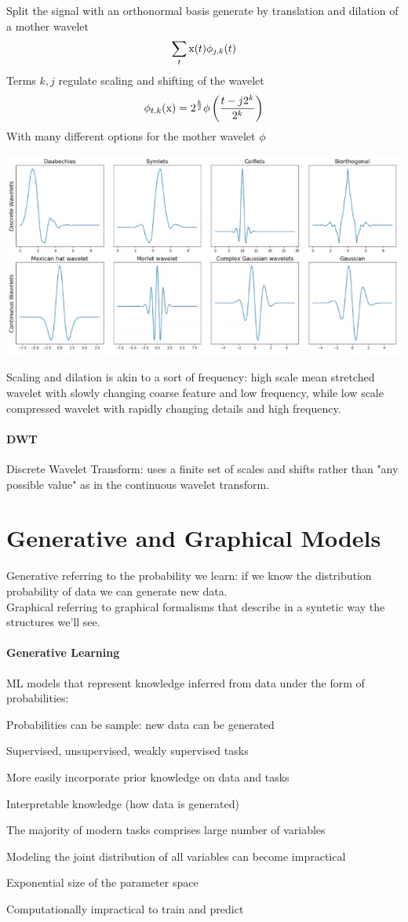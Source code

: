 \documentclass[10pt]{report}
\begin{document}
Split the signal with an orthonormal basis generate by translation and dilation of a mother wavelet $$\sum_t \hbox{x}(t)\phi_{j,k}(t)$$
Terms $k,j$ regulate scaling and shifting of the wavelet
$$\phi_{t,k}(\hbox{x}) = 2^{\frac{k}{2}}\phi\left(\frac{t-j2^k}{2^k}\right)$$
With many different options for the mother wavelet $\phi$
\begin{center}
	\includegraphics[scale=0.5]{13.png}
\end{center}
Scaling and dilation is akin to a sort of frequency: high scale mean stretched wavelet with slowly changing coarse feature and low frequency, while low scale compressed wavelet with rapidly changing details and high frequency.
\paragraph{DWT} Discrete Wavelet Transform: uses a finite set of scales and shifts rather than "any possible value" as in the continuous wavelet transform.
\section{Generative and Graphical Models}
Generative referring to the probability we learn: if we know the distribution probability of data we can generate new data.\\
Graphical referring to graphical formalisms that describe in a syntetic way the structures we'll see.
\paragraph{Generative Learning} ML models that represent knowledge inferred from data under the form of probabilities:
\begin{list}{}{}
	\item Probabilities can be sample: new data can be generated
	\item Supervised, unsupervised, weakly supervised tasks
	\item More easily incorporate prior knowledge on data and tasks
	\item Interpretable knowledge (how data is generated)
\end{list}
The majority of modern tasks comprises large number of variables\begin{list}{}{}
	\item Modeling the joint distribution of all variables can become impractical
	\item Exponential size of the parameter space
	\item Computationally impractical to train and predict
\end{list}
\end{document}
